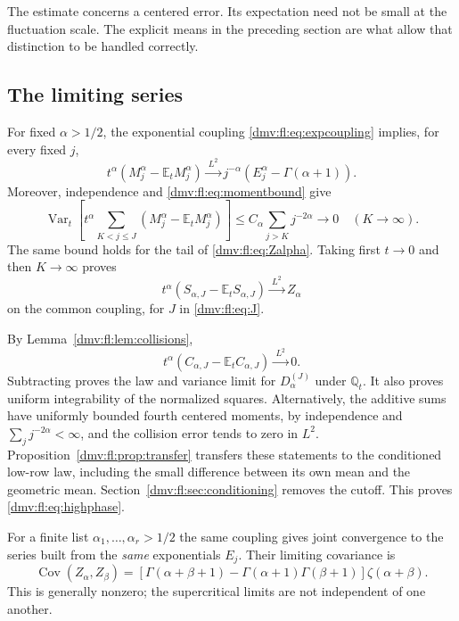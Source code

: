 \documentclass[11pt,letterpaper]{article}
\numberwithin{equation}{section}
\theoremstyle{definition}\newtheorem{definition}[theorem]{Definition}
\theoremstyle{remark}\newtheorem{remark}[theorem]{Remark}
\newcommand{\E}{\mathbb E}
\newcommand{\Q}{\mathbb Q}
\newcommand{\Ltwo}{\xrightarrow{\ L^2\ }}
\DeclareMathOperator{\Var}{Var}
\DeclareMathOperator{\Cov}{Cov}
\begin{document}
The estimate concerns a centered error. Its expectation need not be
small at the fluctuation scale. The explicit means in the preceding
section are what allow that distinction to be handled correctly.

\subsection{The limiting series}
For fixed $\alpha>1/2$, the exponential coupling
\eqref{dmv:fl:eq:expcoupling} implies, for every fixed $j$,
\[
 t^\alpha(M_j^\alpha-\E_tM_j^\alpha)
 \Ltwo j^{-\alpha}(E_j^\alpha-\Gamma(\alpha+1)).
\]
Moreover, independence and \eqref{dmv:fl:eq:momentbound} give
\begin{equation}\label{dmv:fl:eq:seriestail}
 \Var_t\left[t^\alpha\sum_{K<j\le J}
                         (M_j^\alpha-\E_tM_j^\alpha)\right]
 \le C_\alpha\sum_{j>K}j^{-2\alpha}\longrightarrow0
 \quad(K\to\infty).
\end{equation}
The same bound holds for the tail of \eqref{dmv:fl:eq:Zalpha}.
Taking first $t\to0$ and then $K\to\infty$ proves
\begin{equation}\label{dmv:fl:eq:additiveLtwo}
 t^\alpha(S_{\alpha,J}-\E_tS_{\alpha,J})\Ltwo Z_\alpha
\end{equation}
on the common coupling, for $J$ in \eqref{dmv:fl:eq:J}.

By Lemma~\ref{dmv:fl:lem:collisions},
\[
 t^\alpha(C_{\alpha,J}-\E_tC_{\alpha,J})\Ltwo0.
\]
Subtracting proves the law and variance limit for $D_\alpha^{(J)}$
under $\Q_t$. It also proves uniform integrability of the normalized
squares. Alternatively, the additive sums have uniformly bounded
fourth centered moments, by independence and
$\sum_jj^{-2\alpha}<\infty$, and the collision error tends to zero
in $L^2$. Proposition~\ref{dmv:fl:prop:transfer} transfers these statements
to the conditioned low-row law, including the small difference between
its own mean and the geometric mean. Section~\ref{dmv:fl:sec:conditioning}
removes the cutoff. This proves \eqref{dmv:fl:eq:highphase}.

For a finite list $\alpha_1,\ldots,\alpha_r>1/2$ the same coupling
gives joint convergence to the series built from the \emph{same}
exponentials $E_j$. Their limiting covariance is
\begin{equation}\label{dmv:fl:eq:highcov}
 \Cov(Z_\alpha,Z_\beta)=
 [\Gamma(\alpha+\beta+1)-\Gamma(\alpha+1)\Gamma(\beta+1)]
       \zeta(\alpha+\beta).
\end{equation}
This is generally nonzero; the supercritical limits are not independent
of one another.
\end{document}
